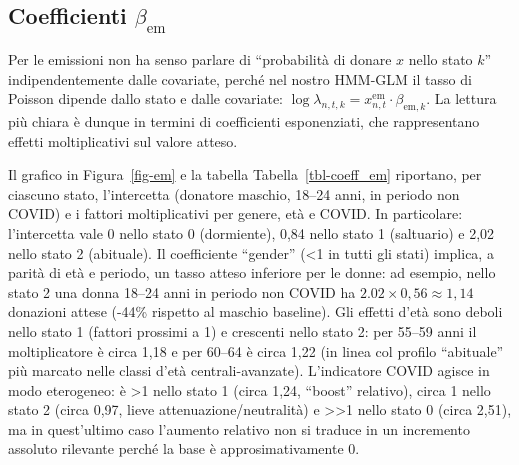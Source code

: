 \documentclass[
  italian,
  a4paper,
  a4paper,
  twoside,
  open=right,
  12pt]{scrbook}
\theoremstyle{definition}
\theoremstyle{remark}
\begin{document}
\subsection{\texorpdfstring{Coefficienti
\(\beta_{\text{em}}\)}{Coefficienti \textbackslash beta\_\{\textbackslash text\{em\}\}}}\label{coefficienti-beta_textem}

Per le emissioni non ha senso parlare di ``probabilità di donare \(x\)
nello stato \(k\)'' indipendentemente dalle covariate, perché nel nostro
HMM-GLM il tasso di Poisson dipende dallo stato e dalle covariate:
\(\log \lambda_{n,t,k} = x^{\text{em}}_{n,t}\cdot \beta_{\text{em},k}\).
La lettura più chiara è dunque in termini di coefficienti esponenziati,
che rappresentano effetti moltiplicativi sul valore atteso.

Il grafico in Figura~\ref{fig-em} e la tabella
Tabella~\ref{tbl-coeff_em} riportano, per ciascuno stato, l'intercetta
(donatore maschio, 18--24 anni, in periodo non COVID) e i fattori
moltiplicativi per genere, età e COVID. In particolare: l'intercetta
vale 0 nello stato 0 (dormiente), 0,84 nello stato 1 (saltuario) e 2,02
nello stato 2 (abituale). Il coefficiente ``gender'' (\textless1 in
tutti gli stati) implica, a parità di età e periodo, un tasso atteso
inferiore per le donne: ad esempio, nello stato 2 una donna 18--24 anni
in periodo non COVID ha \(2.02\times 0{,}56 \approx 1{,}14\) donazioni
attese (-44\% rispetto al maschio baseline). Gli effetti d'età sono
deboli nello stato 1 (fattori prossimi a 1) e crescenti nello stato 2:
per 55--59 anni il moltiplicatore è circa 1,18 e per 60--64 è circa 1,22
(in linea col profilo ``abituale'' più marcato nelle classi d'età
centrali-avanzate). L'indicatore COVID agisce in modo eterogeneo: è
\textgreater1 nello stato 1 (circa 1,24, ``boost'' relativo), circa 1
nello stato 2 (circa 0,97, lieve attenuazione/neutralità) e
\textgreater\textgreater1 nello stato 0 (circa 2,51), ma in quest'ultimo
caso l'aumento relativo non si traduce in un incremento assoluto
rilevante perché la base è approsimativamente 0.
\end{document}
